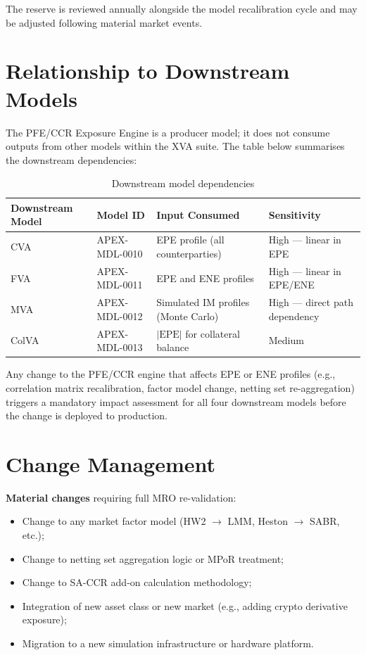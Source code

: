 \documentclass[11pt,a4paper]{article}
\begin{document}
The reserve is reviewed annually alongside the model recalibration cycle and
may be adjusted following material market events.

\section{Relationship to Downstream Models}

The PFE/CCR Exposure Engine is a producer model; it does not consume outputs
from other models within the XVA suite. The table below summarises the
downstream dependencies:

\begin{table}[h!]
\centering
\begin{tabular}{@{}llll@{}}
\toprule
\textbf{Downstream Model} & \textbf{Model ID} & \textbf{Input Consumed} & \textbf{Sensitivity} \\
\midrule
CVA  & APEX-MDL-0010 & EPE profile (all counterparties)       & High --- linear in EPE \\
FVA  & APEX-MDL-0011 & EPE and ENE profiles                   & High --- linear in EPE/ENE \\
MVA  & APEX-MDL-0012 & Simulated IM profiles (Monte Carlo)    & High --- direct path dependency \\
ColVA & APEX-MDL-0013 & $|\text{EPE}|$ for collateral balance & Medium \\
\bottomrule
\end{tabular}
\caption{Downstream model dependencies}
\end{table}

Any change to the PFE/CCR engine that affects EPE or ENE profiles (e.g.,
correlation matrix recalibration, factor model change, netting set
re-aggregation) triggers a mandatory impact assessment for all four downstream
models before the change is deployed to production.

\section{Change Management}

\textbf{Material changes} requiring full MRO re-validation:

\begin{itemize}[noitemsep]
  \item Change to any market factor model (HW2 $\to$ LMM, Heston $\to$ SABR, etc.);
  \item Change to netting set aggregation logic or MPoR treatment;
  \item Change to SA-CCR add-on calculation methodology;
  \item Integration of new asset class or new market (e.g., adding crypto
        derivative exposure);
  \item Migration to a new simulation infrastructure or hardware platform.
\end{itemize}
\end{document}
